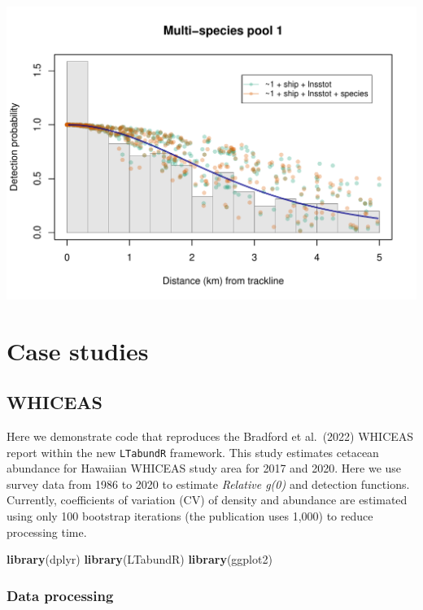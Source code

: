\documentclass[
]{book}
\newenvironment{Shaded}{\begin{snugshade}}{\end{snugshade}}
\newcommand{\FunctionTok}[1]{\textcolor[rgb]{0.13,0.29,0.53}{\textbf{#1}}}
\newcommand{\NormalTok}[1]{#1}
\begin{document}
\includegraphics{figures/unnamed-chunk-325-1.pdf}

\hypertarget{part-case-studies}{%
\part{Case studies}\label{part-case-studies}}

\hypertarget{whiceas}{%
\chapter{WHICEAS}\label{whiceas}}

Here we demonstrate code that reproduces the Bradford et al.~(2022) WHICEAS report within the new \texttt{LTabundR} framework. This study estimates cetacean abundance for Hawaiian WHICEAS study area for 2017 and 2020. Here we use survey data from 1986 to 2020 to estimate \emph{Relative g(0)} and detection functions. Currently, coefficients of variation (CV) of density and abundance are estimated using only 100 bootstrap iterations (the publication uses 1,000) to reduce processing time.

\begin{Shaded}
\begin{Highlighting}[]
\FunctionTok{library}\NormalTok{(dplyr)}
\FunctionTok{library}\NormalTok{(LTabundR)}
\FunctionTok{library}\NormalTok{(ggplot2)}
\end{Highlighting}
\end{Shaded}

\hypertarget{data-processing}{%
\section*{Data processing}\label{data-processing}}
\end{document}
